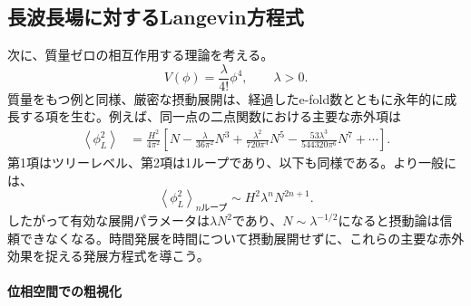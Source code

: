\documentclass[a4paper,11pt,oneside]{article}
\theoremstyle{definition}
\numberwithin{equation}{section}
\begin{document}
\subsection{長波長場に対するLangevin方程式}
\label{sec:stochastic-langevin}



次に、質量ゼロの相互作用する理論を考える。
\begin{equation}
V(\phi)
=
\frac{\lambda}{4!}\phi^{4},
\qquad
\lambda>0.
\end{equation}
質量をもつ例と同様、厳密な摂動展開は、経過したe-fold数とともに永年的に成長する項を生む。例えば、同一点の二点関数における主要な赤外項は\cite{Cespedes:2023aal}
\begin{align}
\left\langle
\phi_{L}^{2}
\right\rangle
&=
\frac{H^{2}}{4\pi^{2}}
\left[
N
-
\frac{\lambda}{36\pi^{2}}N^{3}
+
\frac{\lambda^{2}}{720\pi^{4}}N^{5}
-
\frac{53\lambda^{3}}{544320\pi^{6}}N^{7}
+
\cdots
\right].
\label{quarticsecularseries}
\end{align}
第1項はツリーレベル、第2項は1ループであり、以下も同様である。より一般には、
\begin{equation}
\left\langle
\phi_{L}^{2}
\right\rangle_{n\text{ループ}}
\sim
H^{2}\lambda^{n}N^{2n+1}.
\end{equation}
したがって有効な展開パラメータは\(\lambda N^{2}\)であり、\(N\sim\lambda^{-1/2}\)になると摂動論は信頼できなくなる。時間発展を時間について摂動展開せずに、これらの主要な赤外効果を捉える発展方程式を導こう。





\paragraph{位相空間での粗視化}
\end{document}

